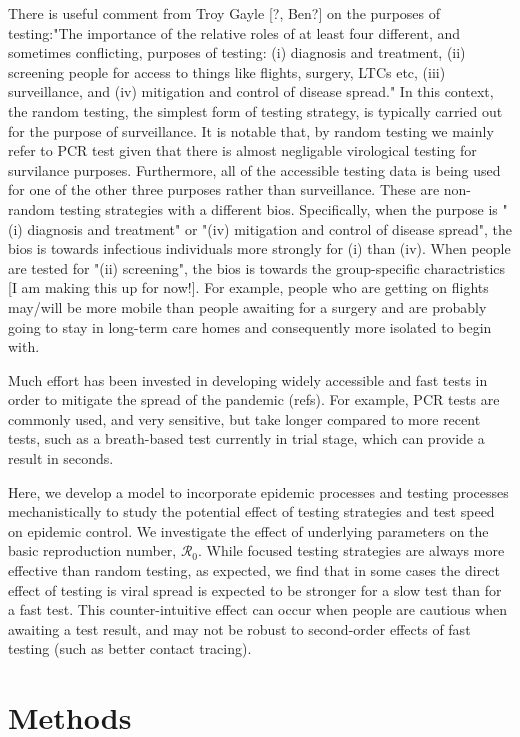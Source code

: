 \documentclass[12pt]{article}
\newcommand{\Rnum}{\mathcal{R}_0}
\theoremstyle{definition} %
\begin{document}
There is useful comment from Troy Gayle [?, Ben?] on the purposes of testing:"The importance of the relative roles of at least four different, and sometimes conflicting, purposes of testing: (i) diagnosis and treatment, (ii) screening people for access to things like flights, surgery, LTCs etc, (iii) surveillance, and (iv) mitigation and control of disease spread." In this context, the random testing, the simplest form of testing strategy, is typically carried out for the purpose of surveillance. It is notable that, by random testing we mainly refer to PCR test given that there is almost negligable virological testing for survilance purposes. Furthermore, all of the accessible testing data is being used for one of the other three purposes rather than surveillance. These are non-random testing strategies with a different bios. Specifically, when the purpose is "(i) diagnosis and treatment" or "(iv) mitigation and control of disease spread", the bios is towards infectious individuals more strongly for (i) than (iv). When people are tested for "(ii) screening", the bios is towards the group-specific charactristics [I am making this up for now!]. For example, people who are getting on flights may/will be more mobile than people awaiting for a surgery and are probably going to stay in long-term care homes and consequently more isolated to begin with.    

Much effort has been invested in developing widely accessible and fast tests in order to mitigate the spread of the pandemic (refs). For example, PCR tests are commonly used, and very sensitive, but take longer compared to more recent tests, such as a breath-based test currently in trial stage, which can provide a result in seconds. 

Here, we develop a model to incorporate epidemic processes and testing processes mechanistically to study the potential effect of testing strategies and test speed on epidemic control. We investigate the effect of underlying parameters on the basic reproduction number, $\Rnum$. While focused testing strategies are always more effective than random testing, as expected, we find that in some cases the direct effect of testing is viral spread is expected to be stronger for a slow test than for a fast test. This counter-intuitive effect can occur when people are cautious when awaiting a test result, and may not be robust to second-order effects of fast testing (such as better contact tracing). 

\section{Methods}
\end{document}
